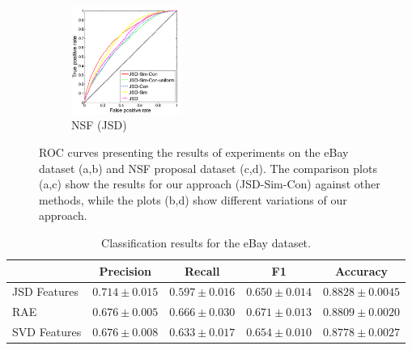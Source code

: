 \documentclass{article} %
\begin{document}
\begin{figure}
        ~ %
        \begin{subfigure}[b]{0.24\textwidth}
        	        \centering
                \includegraphics[width=36mm]{../nips-ml-nlp/figures/nsf-breakdown-kopia.png}
               \caption{NSF (JSD)}
                \label{fig:nsf-breakdown}
        \end{subfigure}
       \caption{ROC curves presenting the results of experiments on
         the eBay dataset (a,b) and NSF proposal dataset (c,d). The
         comparison plots (a,c) show the results for our approach (JSD-Sim-Con)
         against other methods, while the plots (b,d)
         show different variations of our approach. }\label{fig:roc-curves}
\end{figure}


\begin{table}[t]
\caption{Classification results for the eBay dataset.}
\label{tab:classification-results}
\vspace{-4mm}
\begin{center}
\begin{tabular}{|l|c|c|c|c|}
\hline
&Precision & Recall & F1 & Accuracy
\\ \hline 
JSD Features         &$\mathbf{0.714}\pm 0.015$&$0.597\pm 0.016$&$0.650\pm
0.014$& $\mathbf{0.8828}\pm 0.0045$\\
RAE             &$0.676\pm 0.005$&$\mathbf{0.666}\pm 0.030$&$\mathbf{0.671}\pm
0.013$&$0.8809\pm 0.0020$ \\
SVD Features             &$0.676\pm 0.008$&$0.633\pm 0.017$&$0.654\pm
0.010$&$0.8778\pm 0.0027$\\
\hline
\end{tabular}
\end{center}
\end{table}



\end{document}
